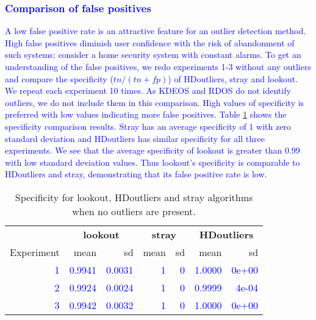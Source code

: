 \documentclass[12pt]{article}
\theoremstyle{definition}
\theoremstyle{definition}
\theoremstyle{definition}
\theoremstyle{remark}
\begin{document}
\hypertarget{section}{%
\subsubsection*{\texorpdfstring{\textcolor{blue}{Comparison of false positives }}{}}\label{section}}


\textcolor{blue}{
A low false positive rate is an attractive feature for an outlier detection method. High false positives diminish user confidence with the risk of abandonment of such systems; consider a home security system with constant alarms. To get an understanding of the false positives, we redo experiments 1-3 without any outliers and compare the specificity ($tn/(tn+fp)$) of HDoutliers, stray and lookout. We repeat each experiment 10 times. As KDEOS and RDOS do not identify outliers, we do not include them in this comparison. High values of specificity is preferred with low values indicating more false positives. Table \ref{tab:zerooutliers} shows the specificity comparison results. Stray has an average specificity of 1 with zero standard deviation and HDoutliers has similar specificity for all three experiments. We see that the average specificity of lookout is greater than $0.99$ with low standard deviation values. Thus lookout's specificity is comparable to HDoutliers and stray, demonstrating that its false positive rate is low. }

\begin{table}

\caption{\label{tab:zerooutliers}Specificity for lookout, HDoutliers and stray algorithms when no outliers are present.}
\centering
\begin{tabular}[t]{rrrrrrr}
\toprule
\multicolumn{1}{c}{\textbf{}} & \multicolumn{2}{c}{\textbf{lookout}} & \multicolumn{2}{c}{\textbf{stray}} & \multicolumn{2}{c}{\textbf{HDoutliers}} \\
\cmidrule(l{3pt}r{3pt}){2-3} \cmidrule(l{3pt}r{3pt}){4-5} \cmidrule(l{3pt}r{3pt}){6-7}
Experiment & mean & sd & mean & sd & mean & sd\\
\midrule
\textcolor{blue}{1} & \textcolor{blue}{0.9941} & \textcolor{blue}{0.0031} & \textcolor{blue}{1} & \textcolor{blue}{0} & \textcolor{blue}{1.0000} & \textcolor{blue}{0e+00}\\
\textcolor{blue}{2} & \textcolor{blue}{0.9924} & \textcolor{blue}{0.0024} & \textcolor{blue}{1} & \textcolor{blue}{0} & \textcolor{blue}{0.9999} & \textcolor{blue}{4e-04}\\
\textcolor{blue}{3} & \textcolor{blue}{0.9942} & \textcolor{blue}{0.0032} & \textcolor{blue}{1} & \textcolor{blue}{0} & \textcolor{blue}{1.0000} & \textcolor{blue}{0e+00}\\
\bottomrule
\end{tabular}
\end{table}
\end{document}
